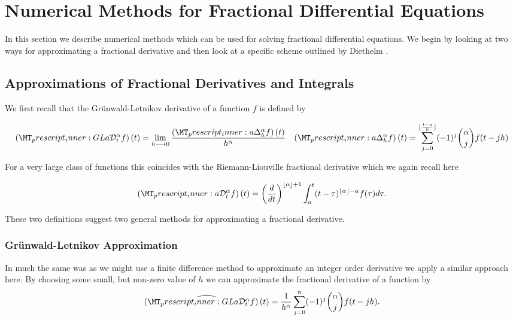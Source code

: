 
\section{Numerical Methods for Fractional Differential Equations}

In this section we describe numerical methods which can be used for solving fractional differential equations. We begin by looking at two ways for approximating a fractional derivative and then look at a specific scheme outlined by Diethelm \cite{Diethelm2011}.

\subsection{Approximations of Fractional Derivatives and Integrals}

We first recall that the Gr\"{u}nwald-Letnikov derivative of a function $ f $ is defined by

\begin{align*}
    \glder{a}{t}{\alpha}{f}(t) = \lim_{h \lra 0} \frac{\fracdelta{a}{\alpha}{h}{f}(t)}{h^\alpha} & & \fracdelta{a}{\alpha}{h}{f}(t) = \sum_{j=0}^{\lfloor \frac{t-a}{h} \rfloor} (-1)^{j} { \alpha \choose j } f(t-jh)
\end{align*}

For a very large class of functions this coincides with the Riemann-Liouville fractional derivative \cite{Podlubny1999} which we again recall here 

\begin{align*}
    \rld{a}{t}{\alpha}{f}(t) = \left( \frac{d}{dt} \right)^{\lfloor \alpha \rfloor + 1} \int_{a}^{t}(t-\tau)^{\lfloor \alpha \rfloor - \alpha} f(\tau)d\tau.
\end{align*}

These two definitions suggest two general methods for approximating a fractional derivative.

\subsubsection{Gr\"{u}nwald-Letnikov Approximation}
In much the same was as we might use a finite difference method to approximate an integer order derivative we apply a similar approach here. By choosing some small, but non-zero value of $ h $ we can approximate the fractional derivative of a function by
\begin{align}
    \widehat{ \glder{a}{t}{\alpha}{f}(t) } = \frac{1}{h^\alpha} \sum_{j=0}^n (-1)^j {\alpha \choose j} f(t - jh).
\end{align}

